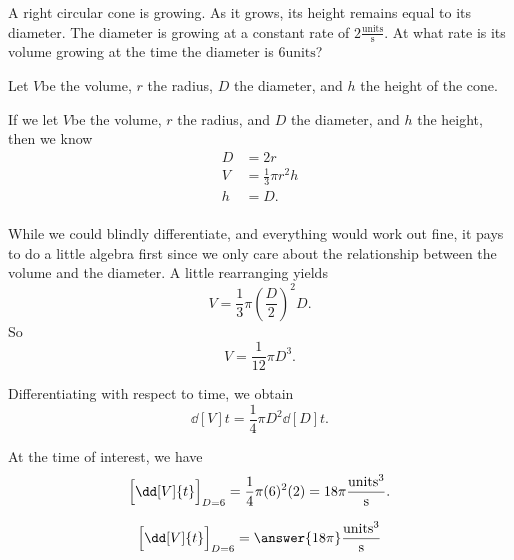 \documentclass{ximera}
\author{Steven Gubkin\and Nela Lakos}
\begin{document}
\begin{exercise}

A right circular cone is growing.  As it grows, its height remains
equal to its diameter. The diameter is growing at a constant rate of
$2 \frac{\textrm{units}}{\textrm{s}}$. At what rate is its volume
growing at the time the diameter is $6 \textrm{units}$?


\begin{hint}
 Let $V$be the volume, $r$ the radius, $D$ the diameter,  and $h$ the height  of the cone.
\end{hint}


\begin{hint}
\begin{image}
\end{image}
\end{hint}


\begin{hint}
  If we let $V$be the volume, $r$ the radius, and $D$ the diameter,  and $h$ the height, then we know
\begin{align*}
	D &= 2r\\
	V &= \frac{1}{3} \pi r^2 h\\
	h &= D.\\
\end{align*}
\end{hint}
\begin{hint}
  While we could blindly differentiate, and everything would work out
  fine, it pays to do a little algebra first since we only care about
  the relationship between the volume and the diameter.  A little
  rearranging yields
\[
V = \frac{1}{3} \pi \left(\frac{D}{2}\right)^2D.
\]
So
\[
V = \frac{1}{12} \pi D^3.
\]
\end{hint}

\begin{hint}
  Differentiating with respect to time, we obtain
  \[
  \dd[V]{t} = \frac{1}{4} \pi D^2 \dd[D]{t}.
  \]
\end{hint}

\begin{hint}
  At the time of interest, we have
  \[
 \Bigl[ \dd[V]{t} \Bigr]_{D=6}= \frac{1}{4} \pi (6)^2 (2) = 18\pi\frac{\textrm{units}^3}{\textrm{s}}.
  \]
\end{hint}

\begin{prompt}
  \[
 \Bigl[ \dd[V]{t} \Bigr]_{D=6} = \answer{18\pi}\frac{\textrm{units}^3}{\textrm{s}}
  \]
\end{prompt}

\end{exercise}
\end{document}

